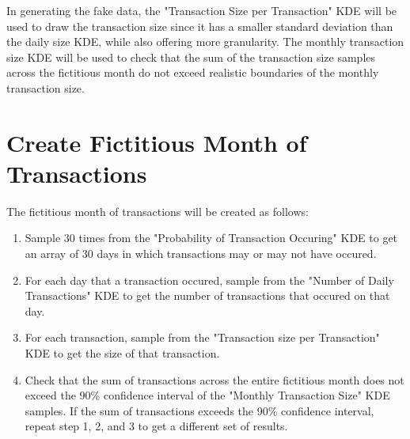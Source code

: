 \documentclass[11pt]{article}
\begin{document}
In generating the fake data, the "Transaction Size per Transaction" KDE
will be used to draw the transaction size since it has a smaller
standard deviation than the daily size KDE, while also offering more
granularity. The monthly transaction size KDE will be used to check that
the sum of the transaction size samples across the fictitious month do
not exceed realistic boundaries of the monthly transaction size.
\newpage
    \section{Create Fictitious Month of Transactions}

The fictitious month of transactions will be created as follows:

\begin{enumerate}
\def\labelenumi{\arabic{enumi})}
\item
  Sample 30 times from the "Probability of Transaction Occuring" KDE to
  get an array of 30 days in which transactions may or may not have
  occured.
\item
  For each day that a transaction occured, sample from the "Number of
  Daily Transactions" KDE to get the number of transactions that occured
  on that day.
\item
  For each transaction, sample from the "Transaction size per
  Transaction" KDE to get the size of that transaction.
\item
  Check that the sum of transactions across the entire fictitious month
  does not exceed the 90\% confidence interval of the "Monthly
  Transaction Size" KDE samples. If the sum of transactions exceeds the
  90\% confidence interval, repeat step 1, 2, and 3 to get a different
  set of results.
\end{enumerate}
\end{document}
